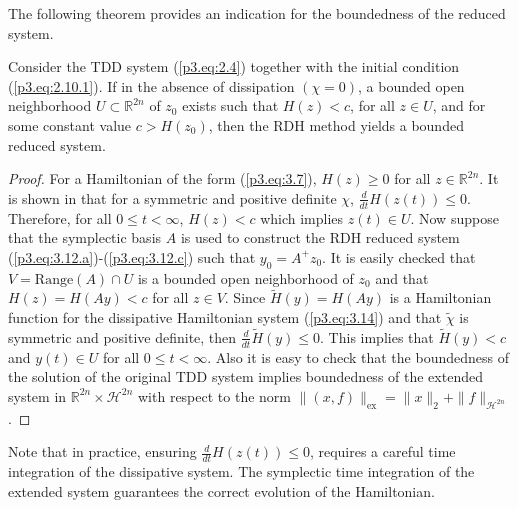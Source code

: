 The following theorem provides an indication for the boundedness of the reduced system.
\begin{theorem} \label{theorem:6.1}
Consider the TDD system (\ref{p3.eq:2.4}) together with the initial condition (\ref{p3.eq:2.10.1}). If in the absence of dissipation $(\chi = 0)$, a bounded open neighborhood $U\subset \mathbb R^{2n}$ of $z_0$ exists such that $H(z)<c$, for all $z\in U$, and for some constant value $c > H(z_0)$, then the RDH method yields a bounded reduced system.
\end{theorem}
\begin{proof} For a Hamiltonian of the form (\ref{p3.eq:3.7}), $H(z)\geq 0$ for all $z\in \mathbb R^{2n}$. It is shown in \cite{figotin2007hamiltonian,figotin2005spectral} that for a symmetric and positive definite $\chi$, $\frac d {dt} H(z(t)) \leq 0$. Therefore, for all $0\leq t <\infty$, $H(z) < c$ which implies $z(t) \in U$. Now suppose that the symplectic basis $A$ is used to construct the RDH reduced system (\ref{p3.eq:3.12.a})-(\ref{p3.eq:3.12.c}) such that $y_0 = A^+z_0$. It is easily checked that $V = \text{Range}(A)\cap U$ is a bounded open neighborhood of $z_0$ and that $H(z) = H(Ay) < c$ for all $z \in V$. Since $\tilde H(y) = H(Ay)$ is a Hamiltonian function for the dissipative Hamiltonian system (\ref{p3.eq:3.14}) and that $\tilde \chi$ is symmetric and positive definite, then $\frac d {dt} \tilde H(y) \leq0$. This implies that $\tilde H(y)<c$ and $y(t)\in U$ for all $0\leq t <\infty$. Also it is easy to check that the boundedness of the solution of the original TDD system implies boundedness of the extended system in $\mathbb R^{2n}\times \mathcal H^{2n}$ with respect to the norm $\| (x,f) \|_{\text{ex}} = \|x\|_2 + \| f \|_{\mathcal H ^{2n}}$.
\end{proof}

Note that in practice, ensuring $\frac d {dt} H(z(t)) \leq 0$, requires a careful time integration of the dissipative system. The symplectic time integration of the extended system guarantees the correct evolution of the Hamiltonian.


